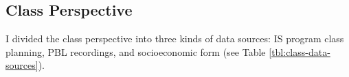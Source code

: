 
        

\subsection{Class Perspective}
\label{results-ss:classroom-data}

I divided the class perspective into three kinds of data sources: \gls{IS} program class planning, \acrfull{PBL} recordings, and socioeconomic form (see Table \ref{tbl:class-data-sources}).

